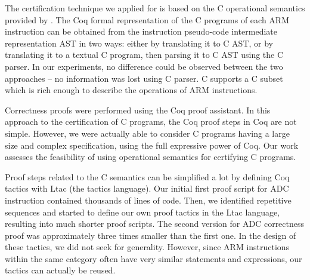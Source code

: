 The certification technique we applied for \simlight is based on the C operational
semantics provided by \compcert.
The Coq formal representation of the C programs of each ARM instruction
can be obtained from
the instruction pseudo-code intermediate representation AST in two ways:
either by translating it to \compcert C AST,
or by translating it to a textual C program,
then parsing it to \compcert C AST using the \compcert C parser.
%
In our experiments, no difference could be observed between the two approaches
-- no information was lost using \compcert C parser.
\compcert C supports a C subset which is rich enough to describe the
operations of ARM instructions.

Correctness proofs were performed using the Coq proof assistant.
In this approach to the certification of C programs,
the Coq proof steps in Coq are not simple.
However, we were actually able to consider C programs
having a large size and complex specification,
using the full expressive power of Coq.
%
%
Our work assesses the feasibility of using operational semantics for
certifying C programs.

Proof steps related to the \compcert C semantics can be simplified
a lot by defining Coq tactics with Ltac (the tactics language).
Our initial first proof script for ADC instruction contained thousands
of lines of code.  Then, we identified repetitive sequences and
started to define our own proof tactics in the Ltac language,
resulting into much shorter proof scripts.  The second version for ADC
correctness proof was approximately three times smaller than the
first one.
In the design of these tactics, we did not seek for generality.
However, since ARM instructions within the same category often have
very similar statements and expressions, our tactics can actually be
reused.

